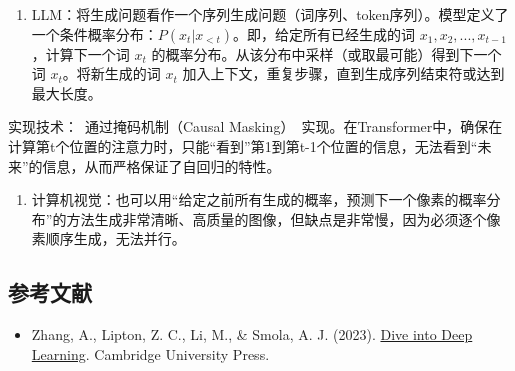 \begin{enumerate}
\def\labelenumi{\arabic{enumi}.}
\tightlist
\item
  LLM：将生成问题看作一个序列生成问题（词序列、token序列）。模型定义了一个条件概率分布：\(P(x_t | x_{<t})\)。即，给定所有已经生成的词 \(x_1, x_2, ..., x_{t-1}\)，计算下一个词 \(x_t\) 的概率分布。从该分布中采样（或取最可能）得到下一个词 \(x_t\)。将新生成的词 \(x_t\) 加入上下文，重复步骤，直到生成序列结束符或达到最大长度。
\end{enumerate}

实现技术：~通过掩码机制（Causal Masking）~实现。在Transformer中，确保在计算第t个位置的注意力时，只能``看到''第1到第t-1个位置的信息，无法看到``未来''的信息，从而严格保证了自回归的特性。

\begin{enumerate}
\def\labelenumi{\arabic{enumi}.}
\setcounter{enumi}{1}
\tightlist
\item
  计算机视觉：也可以用``给定之前所有生成的概率，预测下一个像素的概率分布''的方法生成非常清晰、高质量的图像，但缺点是非常慢，因为必须逐个像素顺序生成，无法并行。
\end{enumerate}

\FloatBarrier
{}
\hypertarget{ux53c2ux8003ux6587ux732e-17}{%
\subsection{参考文献}\label{ux53c2ux8003ux6587ux732e-17}}

\vspace{0.25em}
\begin{itemize}
\tightlist
\item
  Zhang, A., Lipton, Z. C., Li, M., \& Smola, A. J. (2023). \href{https://D2L.ai}{Dive into Deep Learning}. Cambridge University Press.
\end{itemize}

\clearpage
